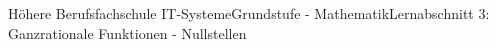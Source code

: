 \documentclass[11pt,oneside,openany,headings=optiontotoc,11pt,numbers=noenddot]{article}
\begin{document}
	\begin{worksheet}{Höhere Berufsfachschule IT-Systeme}{Grundstufe - Mathematik}{Lernabschnitt 3: Ganzrationale Funktionen - Nullstellen}
		\\
		
		
	\end{worksheet}
\end{document}
